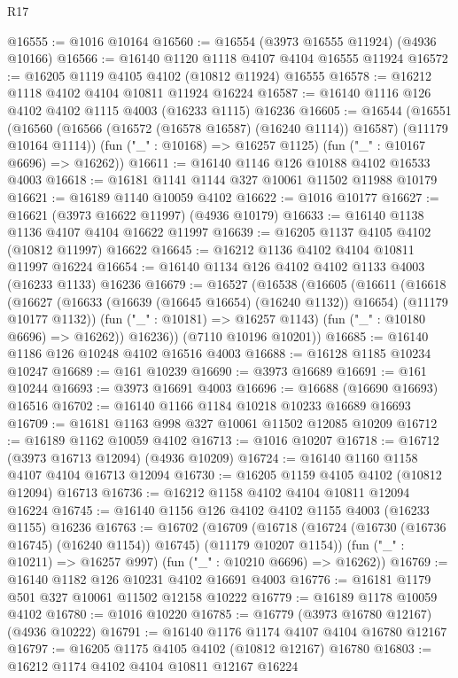 \begin{lexlean}{R17}
\begin{coremodule}
@16555 := @1016 @10164
@16560 := @16554 (@3973 @16555 @11924) (@4936 @10166)
@16566 := @16140 @1120 @1118 @4107 @4104 @16555 @11924
@16572 := @16205 @1119 @4105 @4102 (@10812 @11924) @16555
@16578 := @16212 @1118 @4102 @4104 @10811 @11924 @16224
@16587 := @16140 @1116 @126 @4102 @4102 @1115 @4003 (@16233 @1115) @16236
@16605 := @16544
    (@16551
      (@16560 (@16566 (@16572 (@16578 @16587) (@16240 @1114)) @16587) (@11179 @10164 @1114))
      (fun ("_" : @10168) => @16257 @1125)
      (fun ("_" : @10167 @6696) => @16262))
@16611 := @16140 @1146 @126 @10188 @4102 @16533 @4003
@16618 := @16181 @1141 @1144 @327 @10061 @11502 @11988 @10179
@16621 := @16189 @1140 @10059 @4102
@16622 := @1016 @10177
@16627 := @16621 (@3973 @16622 @11997) (@4936 @10179)
@16633 := @16140 @1138 @1136 @4107 @4104 @16622 @11997
@16639 := @16205 @1137 @4105 @4102 (@10812 @11997) @16622
@16645 := @16212 @1136 @4102 @4104 @10811 @11997 @16224
@16654 := @16140 @1134 @126 @4102 @4102 @1133 @4003 (@16233 @1133) @16236
@16679 := @16527
    (@16538
      (@16605
        (@16611
          (@16618
            (@16627 (@16633 (@16639 (@16645 @16654) (@16240 @1132)) @16654) (@11179 @10177 @1132))
            (fun ("_" : @10181) => @16257 @1143)
            (fun ("_" : @10180 @6696) => @16262))
          @16236))
      (@7110 @10196 @10201))
@16685 := @16140 @1186 @126 @10248 @4102 @16516 @4003
@16688 := @16128 @1185 @10234 @10247
@16689 := @161 @10239
@16690 := @3973 @16689
@16691 := @161 @10244
@16693 := @3973 @16691 @4003
@16696 := @16688 (@16690 @16693) @16516
@16702 := @16140 @1166 @1184 @10218 @10233 @16689 @16693
@16709 := @16181 @1163 @998 @327 @10061 @11502 @12085 @10209
@16712 := @16189 @1162 @10059 @4102
@16713 := @1016 @10207
@16718 := @16712 (@3973 @16713 @12094) (@4936 @10209)
@16724 := @16140 @1160 @1158 @4107 @4104 @16713 @12094
@16730 := @16205 @1159 @4105 @4102 (@10812 @12094) @16713
@16736 := @16212 @1158 @4102 @4104 @10811 @12094 @16224
@16745 := @16140 @1156 @126 @4102 @4102 @1155 @4003 (@16233 @1155) @16236
@16763 := @16702
    (@16709
      (@16718 (@16724 (@16730 (@16736 @16745) (@16240 @1154)) @16745) (@11179 @10207 @1154))
      (fun ("_" : @10211) => @16257 @997)
      (fun ("_" : @10210 @6696) => @16262))
@16769 := @16140 @1182 @126 @10231 @4102 @16691 @4003
@16776 := @16181 @1179 @501 @327 @10061 @11502 @12158 @10222
@16779 := @16189 @1178 @10059 @4102
@16780 := @1016 @10220
@16785 := @16779 (@3973 @16780 @12167) (@4936 @10222)
@16791 := @16140 @1176 @1174 @4107 @4104 @16780 @12167
@16797 := @16205 @1175 @4105 @4102 (@10812 @12167) @16780
@16803 := @16212 @1174 @4102 @4104 @10811 @12167 @16224

\end{coremodule}
\end{lexlean}
